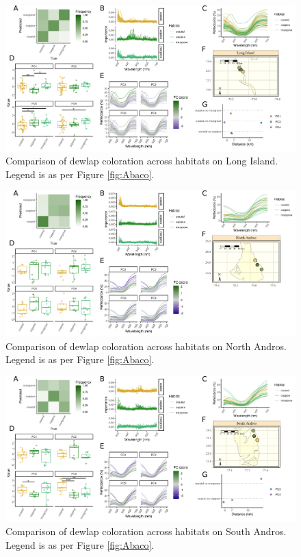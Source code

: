 \begin{figure}[H]
	\centering
	\includegraphics[width=\textwidth]{figures/LongIsland.png}
	\caption{Comparison of dewlap coloration across habitats on Long Island. Legend is as per Figure \ref{fig:Abaco}.}
	\label{fig:LongIsland}
\end{figure}

\begin{figure}[H]
	\centering
	\includegraphics[width=\textwidth]{figures/NorthAndros.png}
	\caption{Comparison of dewlap coloration across habitats on North Andros. Legend is as per Figure \ref{fig:Abaco}.}
	\label{fig:NorthAndros}
\end{figure}

\begin{figure}[H]
	\centering
	\includegraphics[width=\textwidth]{figures/SouthAndros.png}
	\caption{Comparison of dewlap coloration across habitats on South Andros. Legend is as per Figure \ref{fig:Abaco}.}
	\label{fig:SouthAndros}
\end{figure}

